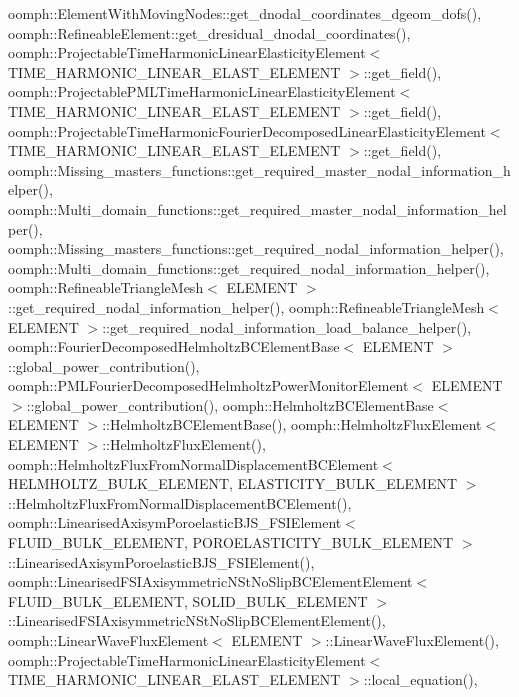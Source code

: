 oomph\+::\+Element\+With\+Moving\+Nodes\+::get\+\_\+dnodal\+\_\+coordinates\+\_\+dgeom\+\_\+dofs(), oomph\+::\+Refineable\+Element\+::get\+\_\+dresidual\+\_\+dnodal\+\_\+coordinates(), oomph\+::\+Projectable\+Time\+Harmonic\+Linear\+Elasticity\+Element$<$ T\+I\+M\+E\+\_\+\+H\+A\+R\+M\+O\+N\+I\+C\+\_\+\+L\+I\+N\+E\+A\+R\+\_\+\+E\+L\+A\+S\+T\+\_\+\+E\+L\+E\+M\+E\+N\+T $>$\+::get\+\_\+field(), oomph\+::\+Projectable\+P\+M\+L\+Time\+Harmonic\+Linear\+Elasticity\+Element$<$ T\+I\+M\+E\+\_\+\+H\+A\+R\+M\+O\+N\+I\+C\+\_\+\+L\+I\+N\+E\+A\+R\+\_\+\+E\+L\+A\+S\+T\+\_\+\+E\+L\+E\+M\+E\+N\+T $>$\+::get\+\_\+field(), oomph\+::\+Projectable\+Time\+Harmonic\+Fourier\+Decomposed\+Linear\+Elasticity\+Element$<$ T\+I\+M\+E\+\_\+\+H\+A\+R\+M\+O\+N\+I\+C\+\_\+\+L\+I\+N\+E\+A\+R\+\_\+\+E\+L\+A\+S\+T\+\_\+\+E\+L\+E\+M\+E\+N\+T $>$\+::get\+\_\+field(), oomph\+::\+Missing\+\_\+masters\+\_\+functions\+::get\+\_\+required\+\_\+master\+\_\+nodal\+\_\+information\+\_\+helper(), oomph\+::\+Multi\+\_\+domain\+\_\+functions\+::get\+\_\+required\+\_\+master\+\_\+nodal\+\_\+information\+\_\+helper(), oomph\+::\+Missing\+\_\+masters\+\_\+functions\+::get\+\_\+required\+\_\+nodal\+\_\+information\+\_\+helper(), oomph\+::\+Multi\+\_\+domain\+\_\+functions\+::get\+\_\+required\+\_\+nodal\+\_\+information\+\_\+helper(), oomph\+::\+Refineable\+Triangle\+Mesh$<$ E\+L\+E\+M\+E\+N\+T $>$\+::get\+\_\+required\+\_\+nodal\+\_\+information\+\_\+helper(), oomph\+::\+Refineable\+Triangle\+Mesh$<$ E\+L\+E\+M\+E\+N\+T $>$\+::get\+\_\+required\+\_\+nodal\+\_\+information\+\_\+load\+\_\+balance\+\_\+helper(), oomph\+::\+Fourier\+Decomposed\+Helmholtz\+B\+C\+Element\+Base$<$ E\+L\+E\+M\+E\+N\+T $>$\+::global\+\_\+power\+\_\+contribution(), oomph\+::\+P\+M\+L\+Fourier\+Decomposed\+Helmholtz\+Power\+Monitor\+Element$<$ E\+L\+E\+M\+E\+N\+T $>$\+::global\+\_\+power\+\_\+contribution(), oomph\+::\+Helmholtz\+B\+C\+Element\+Base$<$ E\+L\+E\+M\+E\+N\+T $>$\+::\+Helmholtz\+B\+C\+Element\+Base(), oomph\+::\+Helmholtz\+Flux\+Element$<$ E\+L\+E\+M\+E\+N\+T $>$\+::\+Helmholtz\+Flux\+Element(), oomph\+::\+Helmholtz\+Flux\+From\+Normal\+Displacement\+B\+C\+Element$<$ H\+E\+L\+M\+H\+O\+L\+T\+Z\+\_\+\+B\+U\+L\+K\+\_\+\+E\+L\+E\+M\+E\+N\+T, E\+L\+A\+S\+T\+I\+C\+I\+T\+Y\+\_\+\+B\+U\+L\+K\+\_\+\+E\+L\+E\+M\+E\+N\+T $>$\+::\+Helmholtz\+Flux\+From\+Normal\+Displacement\+B\+C\+Element(), oomph\+::\+Linearised\+Axisym\+Poroelastic\+B\+J\+S\+\_\+\+F\+S\+I\+Element$<$ F\+L\+U\+I\+D\+\_\+\+B\+U\+L\+K\+\_\+\+E\+L\+E\+M\+E\+N\+T, P\+O\+R\+O\+E\+L\+A\+S\+T\+I\+C\+I\+T\+Y\+\_\+\+B\+U\+L\+K\+\_\+\+E\+L\+E\+M\+E\+N\+T $>$\+::\+Linearised\+Axisym\+Poroelastic\+B\+J\+S\+\_\+\+F\+S\+I\+Element(), oomph\+::\+Linearised\+F\+S\+I\+Axisymmetric\+N\+St\+No\+Slip\+B\+C\+Element\+Element$<$ F\+L\+U\+I\+D\+\_\+\+B\+U\+L\+K\+\_\+\+E\+L\+E\+M\+E\+N\+T, S\+O\+L\+I\+D\+\_\+\+B\+U\+L\+K\+\_\+\+E\+L\+E\+M\+E\+N\+T $>$\+::\+Linearised\+F\+S\+I\+Axisymmetric\+N\+St\+No\+Slip\+B\+C\+Element\+Element(), oomph\+::\+Linear\+Wave\+Flux\+Element$<$ E\+L\+E\+M\+E\+N\+T $>$\+::\+Linear\+Wave\+Flux\+Element(), oomph\+::\+Projectable\+Time\+Harmonic\+Linear\+Elasticity\+Element$<$ T\+I\+M\+E\+\_\+\+H\+A\+R\+M\+O\+N\+I\+C\+\_\+\+L\+I\+N\+E\+A\+R\+\_\+\+E\+L\+A\+S\+T\+\_\+\+E\+L\+E\+M\+E\+N\+T $>$\+::local\+\_\+equation(), 